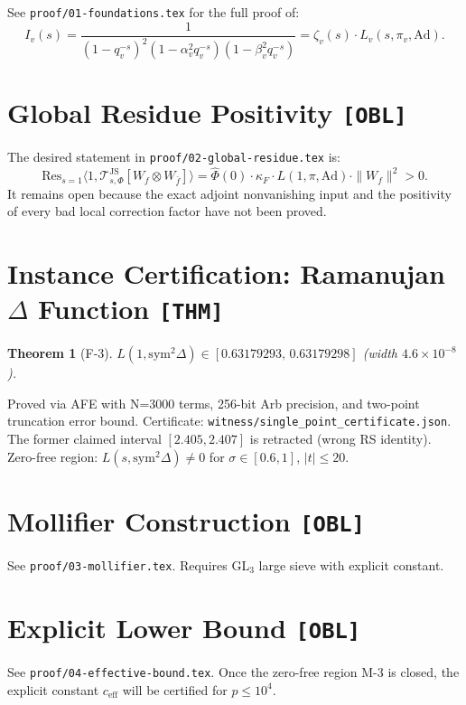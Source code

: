 \documentclass[12pt]{article}
\newtheorem{theorem}{Theorem}[section]
\begin{document}
See \texttt{proof/01-foundations.tex} for the full proof of:
\[
  I_v(s) = \frac{1}{(1-q_v^{-s})^2(1-\alpha_v^2 q_v^{-s})(1-\beta_v^2 q_v^{-s})}
  = \zeta_v(s)\cdot L_v(s,\pi_v,\mathrm{Ad}).
\]

\section{Global Residue Positivity \texttt{[OBL]}}

The desired statement in \texttt{proof/02-global-residue.tex} is:
\[
  \mathrm{Res}_{s=1}\langle 1, \mathcal{T}_{s,\Phi}^{\mathrm{JS}}[W_f\otimes W_{\bar f}]\rangle
  = \hat\Phi(0)\cdot\kappa_F\cdot L(1,\pi,\mathrm{Ad})\cdot\|W_f\|^2 > 0.
\]
It remains open because the exact adjoint nonvanishing input and the positivity
of every bad local correction factor have not been proved.

\section{Instance Certification: Ramanujan $\Delta$ Function \texttt{[THM]}}

\begin{theorem}[F-3]\label{thm:f3}
$L(1,\mathrm{sym}^2\Delta) \in [0.63179293,\, 0.63179298]$ (width $4.6\times10^{-8}$).
\end{theorem}

Proved via AFE with N=3000 terms, 256-bit Arb precision, and two-point truncation
error bound.  Certificate: \texttt{witness/single\_point\_certificate.json}.
The former claimed interval $[2.405,2.407]$ is retracted (wrong RS identity).
Zero-free region: $L(s,\mathrm{sym}^2\Delta) \neq 0$ for $\sigma \in [0.6,1]$, $|t| \leq 20$.

\section{Mollifier Construction \texttt{[OBL]}}

See \texttt{proof/03-mollifier.tex}. Requires GL$_3$ large sieve with explicit constant.

\section{Explicit Lower Bound \texttt{[OBL]}}

See \texttt{proof/04-effective-bound.tex}.
Once the zero-free region M-3 is closed, the explicit constant $c_{\mathrm{eff}}$
will be certified for $p \leq 10^4$.
\end{document}
